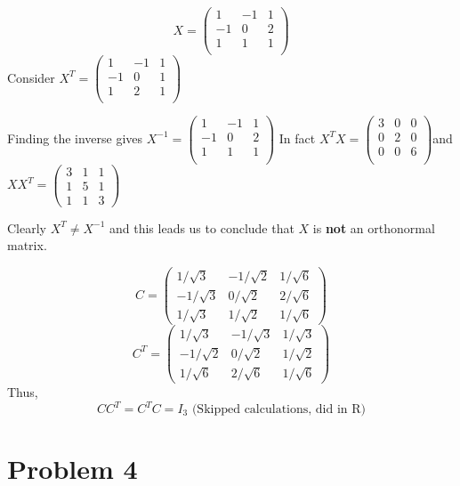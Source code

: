 \documentclass[a4paper]{article}
\begin{document}
$$
X = \begin{pmatrix} 
1 & -1 & 1\\
-1 & 0 & 2\\
1 & 1 & 1\\
\end{pmatrix}
$$Consider $X^T = \begin{pmatrix} 
1 & -1 & 1\\
-1 & 0 & 1\\
1 & 2 & 1\\
\end{pmatrix}$

Finding the inverse gives $X^{-1} =   \begin{pmatrix} 
1 & -1 & 1\\
-1 & 0 & 2\\
1 & 1 & 1\\
\end{pmatrix}$
In fact $X^TX = \begin{pmatrix}3 & 0 & 0\\ 
0 & 2 & 0\\
0 & 0 & 6\\
\end{pmatrix}$and $XX^T = \begin{pmatrix}3 & 1 & 1\\ 1 & 5 & 1\\ 1 & 1 &3
\end{pmatrix}$

Clearly $X^T \neq X^{-1}$ and this leads us to conclude that $X$ is \textbf{not} an orthonormal matrix.

$$
C = \begin{pmatrix} 1/\sqrt{3} & -1/\sqrt{2} & 1/\sqrt{6}\\
-1/\sqrt{3} & 0/\sqrt{2} & 2/\sqrt{6}\\
1/\sqrt{3} & 1/\sqrt{2} & 1/\sqrt{6}
\end{pmatrix}
$$
$$
C^T = \begin{pmatrix} 1/\sqrt{3} & -1/\sqrt{3} & 1/\sqrt{3}\\
-1/\sqrt{2} & 0/\sqrt{2} & 1/\sqrt{2}\\
1/\sqrt{6} & 2/\sqrt{6} & 1/\sqrt{6}
\end{pmatrix}
$$
Thus, $$CC^T = C^TC = I_3 \text{ (Skipped calculations, did in R)}$$ 








\section*{Problem 4}
\end{document}
